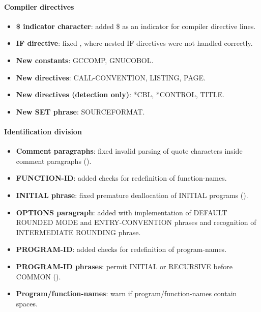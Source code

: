 \paragraph{Compiler directives}
\begin{itemize}
\item \textbf{\$ indicator character}: added \$ as an indicator for compiler directive lines.
\item \textbf{\directiveindicator{}IF directive}: fixed , where nested \directiveindicator{}IF directives were not handled correctly.
\item \textbf{New constants}: GCCOMP, GNUCOBOL.
\item \textbf{New directives}: \directiveindicator{}CALL-CONVENTION, \directiveindicator{}LISTING, \directiveindicator{}PAGE. %
\item \textbf{New directives (detection only)}: *CBL, *CONTROL, TITLE.
\item \textbf{New \directiveindicator{}SET phrase}: SOURCEFORMAT.
\end{itemize}

\paragraph{Identification division}
\begin{itemize}
\item \textbf{Comment paragraphs}: fixed invalid parsing of quote characters inside comment paragraphs ().
\item \textbf{FUNCTION-ID}: added checks for redefinition of function-names.
\item \textbf{INITIAL phrase}: fixed premature deallocation of INITIAL programs ().
\item \textbf{OPTIONS paragraph}: added with implementation of DEFAULT ROUNDED MODE and ENTRY-CONVENTION phrases and recognition of INTERMEDIATE ROUNDING phrase.
\item \textbf{PROGRAM-ID}: added checks for redefinition of program-names.
\item \textbf{PROGRAM-ID phrases}: permit INITIAL or RECURSIVE before COMMON ().
\item \textbf{Program\slash{}function-names}: warn if program\slash{}function-names contain spaces.
\end{itemize}

